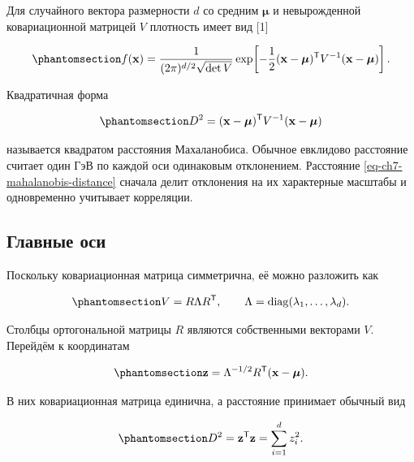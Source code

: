 \documentclass[
  russian,
  11pt,
  a4paper,
  open=any]{scrbook}
\begin{document}
Для случайного вектора размерности \(d\) со средним \(\boldsymbol\mu\) и
невырожденной ковариационной матрицей \(V\) плотность имеет вид {[}1{]}

\begin{equation}\protect\phantomsection\label{eq-ch7-multivariate-normal-density}{
f(\mathbf x)=
\frac{1}{(2\pi)^{d/2}\sqrt{\det V}}
\exp\!\left[-\frac12
(\mathbf x-\boldsymbol\mu)^{\mathsf T}
V^{-1}
(\mathbf x-\boldsymbol\mu)
\right].
}\end{equation}

Квадратичная форма

\begin{equation}\protect\phantomsection\label{eq-ch7-mahalanobis-distance}{
D^2=(\mathbf x-\boldsymbol\mu)^{\mathsf T}
V^{-1}
(\mathbf x-\boldsymbol\mu)
}\end{equation}

называется квадратом расстояния Махаланобиса. Обычное евклидово
расстояние считает один ГэВ по каждой оси одинаковым отклонением.
Расстояние \ref{eq-ch7-mahalanobis-distance} сначала делит отклонения на
их характерные масштабы и одновременно учитывает корреляции.

\subsection{Главные
оси}\label{ux433ux43bux430ux432ux43dux44bux435-ux43eux441ux438}

Поскольку ковариационная матрица симметрична, её можно разложить как

\begin{equation}\protect\phantomsection\label{eq-ch7-covariance-eigendecomposition}{
V=R\Lambda R^{\mathsf T},
\qquad
\Lambda=\operatorname{diag}(\lambda_1,\ldots,\lambda_d).
}\end{equation}

Столбцы ортогональной матрицы \(R\) являются собственными векторами
\(V\). Перейдём к координатам

\begin{equation}\protect\phantomsection\label{eq-ch7-whitened-coordinates}{
\mathbf z=\Lambda^{-1/2}R^{\mathsf T}
(\mathbf x-\boldsymbol\mu).
}\end{equation}

В них ковариационная матрица единична, а расстояние принимает обычный
вид

\begin{equation}\protect\phantomsection\label{eq-ch7-mahalanobis-whitened}{
D^2=\mathbf z^{\mathsf T}\mathbf z
=\sum_{i=1}^{d}z_i^2.
}\end{equation}
\end{document}
